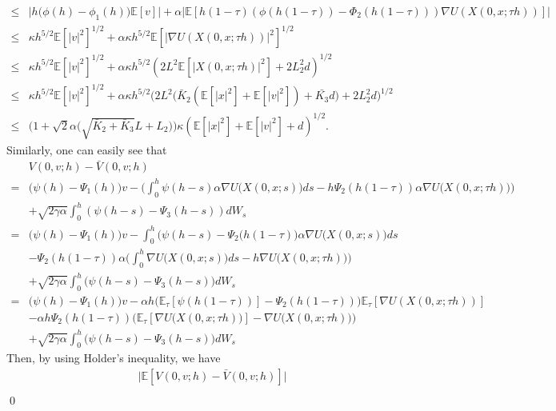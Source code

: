 \documentclass[12pt]{article}
\numberwithin{equation}{section}
\renewenvironment{proof}%
  {\begin{trivlist}%
   \item[]\ignorespaces}%
  {\qed\end{trivlist}}
\newcommand{\E}{\mathbb{E}}
\begin{document}
\begin{proof}
\begin{align}
        \leq & \big|h \big(\phi(h)-\phi_1(h) \big)\mathbb{E}[v] \big|+\alpha\big|\mathbb{E}[h(1-\tau)(\phi(h(1-\tau))-\Phi_2(h(1-\tau)))\nabla U(X(0,x;\tau h))]\big|\nonumber\\
        \leq & \kappa h^{5/2}\mathbb{E}[|v|^2]^{1/2}+\alpha\kappa h^{5/2}\mathbb{E}[|\nabla U(X(0,x;\tau h))|^2]^{1/2} \nonumber\\
        \leq & \kappa h^{5/2}\mathbb{E}[|v|^2]^{1/2}+\alpha\kappa h^{5/2} (2L^2\E[|X(0,x;\tau h)|^2]+2L_2^2d)^{1/2} \nonumber\\
        \leq & \kappa h^{5/2}\mathbb{E}[|v|^2]^{1/2}+\alpha\kappa h^{5/2}\Big(2L^2\big(\bar{K}_2(\E[|x|^2]+\E[|v|^2])+\bar{K_3}d\big)+2L_2^2d\Big)^{1/2}\nonumber\\
        \leq & \Big(1+\sqrt{2}\alpha \big(\sqrt{\bar{K}_2+\bar{K}_3}L+L_2\big)\Big)\kappa (\E[|x|^2]+\E[|v|^2]+d)^{1/2}.
    \end{align}
    Similarly, one can easily see that 
    \begin{align}
        &V(0,v;h)-\bar{V}(0,v;h)\nonumber\\
        = & \big(\psi(h)-\Psi_1(h)\big)v-\Big(\int^h_0 \psi(h-s)\alpha\nabla U\big(X(0,x;s)\big)ds-h\Psi_2(h(1-\tau))\alpha\nabla U\big(X(0,x;\tau h)\big)\Big)\nonumber \\
        & +\sqrt{2\gamma\alpha}\int^h_0 (\psi(h-s)-\Psi_3(h-s)) dW_s\nonumber \\
        =&  \big(\psi(h)-\Psi_1(h) \big)v-\int^h_0  \big(\psi(h-s)-\Psi_2(h(1-\tau) \big)\alpha\nabla U \big(X(0,x;s) \big)ds\nonumber\\
        & -\Psi_2(h(1-\tau))\alpha \Big(\int^h_0 \nabla U \big(X(0,x;s) \big) ds- h \nabla U \big(X(0,x;\tau h) \big)\Big) \nonumber\\
        &+\sqrt{2\gamma\alpha}\int^h_0  \big(\psi(h-s)-\Psi_3(h-s) \big) dW_s\nonumber \\
        =&  \big(\psi(h)-\Psi_1(h) \big)v- \alpha h \big(\E_\tau[\psi(h(1-\tau))]-\Psi_2(h(1-\tau)) \big)\E_\tau[\nabla U(X(0,x;\tau h))]\nonumber\\
        & -\alpha h\Psi_2(h(1-\tau)) \Big(\E_\tau[\nabla U \big(X(0,x;\tau h) \big)]-  \nabla U \big(X(0,x;\tau h) \big)\Big) \nonumber\\
        & +\sqrt{2\gamma\alpha}\int^h_0  \big(\psi(h-s)-\Psi_3(h-s) \big) dW_s
    \end{align}
    Then, by using Holder's inequality, we have
    \begin{align}
        & \big|\mathbb{E}[V(0,v;h)-\bar{V}(0,v;h)] \big|\nonumber\\

\end{align}
\end{proof}
\end{document}
